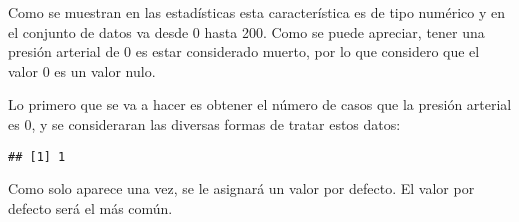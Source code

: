 \documentclass[
]{article}
\newenvironment{Shaded}{\begin{snugshade}}{\end{snugshade}}
\newcommand{\CommentTok}[1]{\textcolor[rgb]{0.50,0.62,0.50}{#1}}
\newcommand{\ControlFlowTok}[1]{\textcolor[rgb]{0.94,0.87,0.69}{#1}}
\newcommand{\DecValTok}[1]{\textcolor[rgb]{0.86,0.86,0.80}{#1}}
\newcommand{\FunctionTok}[1]{\textcolor[rgb]{0.94,0.94,0.56}{#1}}
\newcommand{\NormalTok}[1]{\textcolor[rgb]{0.80,0.80,0.80}{#1}}
\newcommand{\OtherTok}[1]{\textcolor[rgb]{0.94,0.94,0.56}{#1}}
\newcommand{\SpecialCharTok}[1]{\textcolor[rgb]{0.86,0.64,0.64}{#1}}
\begin{document}
Como se muestran en las estadísticas esta característica es de tipo
numérico y en el conjunto de datos va desde 0 hasta 200. Como se puede
apreciar, tener una presión arterial de 0 es estar considerado muerto,
por lo que considero que el valor 0 es un valor nulo.

Lo primero que se va a hacer es obtener el número de casos que la
presión arterial es 0, y se consideraran las diversas formas de tratar
estos datos:

\begin{Shaded}
\end{Shaded}

\begin{verbatim}
## [1] 1
\end{verbatim}

Como solo aparece una vez, se le asignará un valor por defecto. El valor
por defecto será el más común.

\begin{Shaded}
\end{Shaded}
\end{document}
